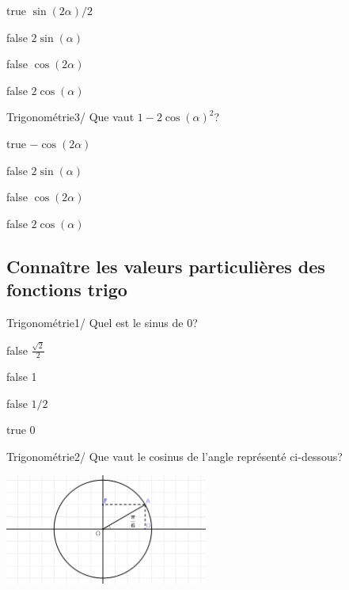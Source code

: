\documentclass[11pt]{article}
\begin{document}
            \begin{reponses}
                \item[true] $\sin(2\alpha)/2$
                \item[false] $2\sin(\alpha)$
                \item[false] $\cos(2\alpha)$
                \item[false] $2\cos(\alpha)$
            \end{reponses}

            \begin{question}{47}{Trigonométrie}{3}{/}
            	Que vaut $1-2\cos(\alpha)^2$?
            \end{question}

            \begin{reponses}
                \item[true] $-\cos(2\alpha)$
                \item[false] $2\sin(\alpha)$
                \item[false] $\cos(2\alpha)$
                \item[false] $2\cos(\alpha)$
            \end{reponses}
    
		\subsection{Connaître les valeurs particulières des fonctions trigo}
        
        	\begin{question}{31}{Trigonométrie}{1}{/}
				Quel est le sinus de $0$?
            \end{question}

            \begin{reponses}
            	\item[false] $\frac{\sqrt{2}}{2}$
            	\item[false] 1
                \item[false] $1/2$
                \item[true] 0
            \end{reponses}

            \begin{question}{31}{Trigonométrie}{2}{/}
                Que vaut le cosinus de l'angle représenté ci-dessous?
                \begin{center}
                	\includegraphics[width=0.5\textwidth]{Philippe/Figures_Philippe/trigo_1_3.png}
                \end{center}
            \end{question}
\end{document}
